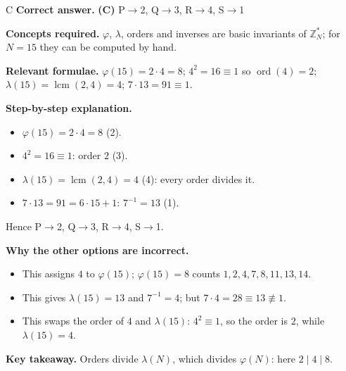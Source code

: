 \documentclass[11pt,a4paper]{article}
\newcommand{\qsep}{\par\vspace{2pt}{\color{black!15}\hrule}\vspace{4pt}}
\begin{document}
\begin{solbox}{C}
\textbf{\color{brand}Correct answer.} \textcolor{okgreen}{\textbf{(C)}} P$\to$2, Q$\to$3, R$\to$4, S$\to$1

\textbf{\color{brand}Concepts required.} $\varphi$, $\lambda$, orders and inverses are basic invariants of $\mathbb Z_N^*$; for $N = 15$ they can be computed by hand.

\textbf{\color{brand}Relevant formulae.} $\varphi(15) = 2\cdot4 = 8$; $4^2 = 16 \equiv 1$ so $\operatorname{ord}(4) = 2$; $\lambda(15) = \operatorname{lcm}(2, 4) = 4$; $7\cdot13 = 91 \equiv 1$.

\textbf{\color{brand}Step-by-step explanation.} \begin{itemize}\itemsep0pt
\item $\varphi(15) = 2\cdot4 = 8$ (2).
\item $4^2 = 16 \equiv 1$: order $2$ (3).
\item $\lambda(15) = \operatorname{lcm}(2, 4) = 4$ (4): every order divides it.
\item $7\cdot13 = 91 = 6\cdot15 + 1$: $7^{-1} = 13$ (1).
\end{itemize}
Hence P$\to$2, Q$\to$3, R$\to$4, S$\to$1.

\textbf{\color{brand}Why the other options are incorrect.}
\begin{itemize}[leftmargin=2.4em, itemsep=1pt, topsep=2pt]
\item[\textbf{(A)}] This assigns $4$ to $\varphi(15)$; $\varphi(15) = 8$ counts $1, 2, 4, 7, 8, 11, 13, 14$.
\item[\textbf{(B)}] This gives $\lambda(15) = 13$ and $7^{-1} = 4$; but $7\cdot4 = 28 \equiv 13 \not\equiv 1$.
\item[\textbf{(D)}] This swaps the order of $4$ and $\lambda(15)$: $4^2 \equiv 1$, so the order is $2$, while $\lambda(15) = 4$.
\end{itemize}
\textbf{\color{brand}Key takeaway.} Orders divide $\lambda(N)$, which divides $\varphi(N)$: here $2 \mid 4 \mid 8$.
\end{solbox}
\qsep
\end{document}
